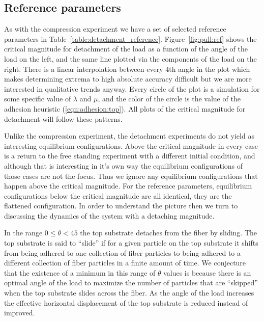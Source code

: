 {\subsection{Reference parameters}

As with the compression experiment we have a set of selected reference parameters in Table~\ref{table:detachment_reference}. Figure~\ref{fig:pull:ref} shows the critical magnitude for detachment of the load as a function of the angle of the load on the left, and the same line plotted via the components of the load on the right. There is a linear interpolation between every $4$th angle in the plot which makes determining extrema to high absolute accuracy difficult but we are more interested in qualitative trends anyway. Every circle of the plot is a simulation for some specific value of $\lambda$ and $\mu$, and the color of the circle is the value of the adhesion heuristic (\ref{eqn:adhesion:top}). All plots of the critical magnitude for detachment will follow these patterns.

Unlike the compression experiment, the detachment experiments do not yield as interesting equilibrium configurations. Above the critical magnitude in every case is a return to the free standing experiment with a different initial condition, and although that is interesting in it's own way the equilibrium configurations of those cases are not the focus. Thus we ignore any equilibrium configurations that happen above the critical magnitude. For the reference parameters, equilibrium configurations below the critical magnitude are all identical, they are the flattened configuration. In order to understand the picture then we turn to discussing the dynamics of the system with a detaching magnitude.

In the range $0 \leq \theta < 45$ the top substrate detaches from the fiber by sliding. The top substrate is said to ``slide'' if for a given particle on the top substrate it shifts from being adhered to one collection of fiber particles to being adhered to a different collection of fiber particles in a finite amount of time. We conjecture that the existence of a minimum in this range of $\theta$ values is because there is an optimal angle of the load to maximize the number of particles that are ``skipped'' when the top substrate slides across the fiber. As the angle of the load increases the effective horizontal displacement of the top substrate is reduced instead of improved.

}
